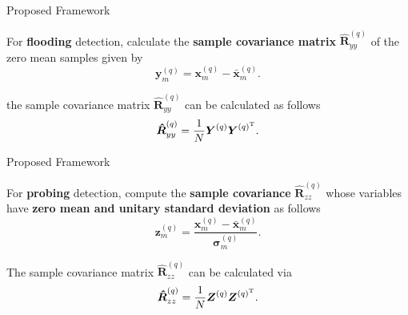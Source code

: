 \documentclass[newPxFont, numfooter, sectionpages]{beamer}
\begin{document}
\begin{frame}{Proposed Framework}
	
	For \textbf{flooding} detection, calculate the \textbf{sample covariance matrix} $\boldsymbol{\hat{R}}_{yy}^{(q)}$ of the zero mean samples given by
	\begin{equation}\label{eq:eq02}
		\boldsymbol{y}_{m}^{(q)} = \boldsymbol{x}_{m}^{(q)} - \bar{\boldsymbol{x}}_{m}^{(q)}.
	\end{equation}

	the sample covariance matrix $\boldsymbol{\hat{R}}_{yy}^{(q)}$ can be calculated as follows
	\begin{equation}\label{eq:eq03}
		\boldsymbol{\hat{R}}_{yy}^{(q)} = \frac{1}{N}\boldsymbol{Y}^{(q)}\boldsymbol{Y}^{(q)^{\rm T}}.
	\end{equation}

\end{frame}
\begin{frame}{Proposed Framework}
	
	For \textbf{probing} detection, compute the \textbf{sample covariance} $\boldsymbol{\hat{R}}_{zz}^{(q)}$ whose variables have \textbf{zero mean and unitary standard deviation} as follows
	\begin{equation}\label{eq:eq04}
		\boldsymbol{z}_{m}^{(q)} = \frac{\boldsymbol{x}_{m}^{(q)} - \bar{\boldsymbol{x}}_{m}^{(q)}}{\boldsymbol{\sigma}_{m}^{(q)}}.
	\end{equation}

	The sample covariance matrix $\boldsymbol{\hat{R}}_{zz}^{(q)}$ can be calculated via 
	\begin{equation}\label{eq:eq05}
		\boldsymbol{\hat{R}}_{zz}^{(q)} = \frac{1}{N}\boldsymbol{Z}^{(q)}\boldsymbol{Z}^{(q)^{\rm T}}.
	\end{equation}

\end{frame}
\end{document}
